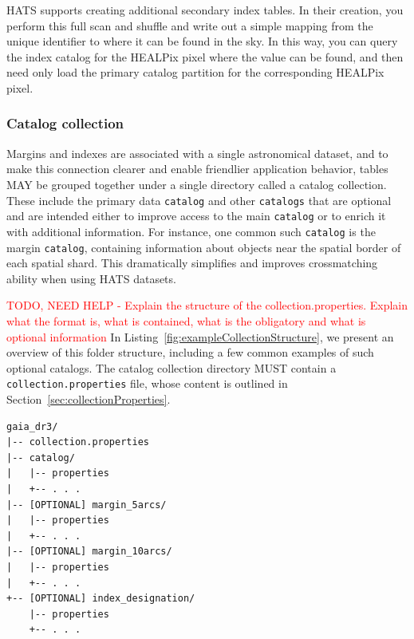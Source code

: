 \documentclass[11pt,a4paper]{ivoa}
\begin{document}
HATS supports creating additional secondary index tables. 
In their creation, you perform this full scan and shuffle and write out a simple mapping from the unique identifier to where it can be found in the sky.
In this way, you can query the index catalog for the HEALPix pixel where the value can be found, and then need only load the primary catalog partition for the corresponding HEALPix pixel.

\subsubsection{Catalog collection} \label{sec:collection}

Margins and indexes are associated with a single astronomical dataset, and to make this connection clearer and enable friendlier application behavior, tables MAY be grouped together under a single directory called a catalog collection.
These include the primary data \texttt{catalog} and other \texttt{catalogs} that are optional and are intended either to improve access to the main \texttt{catalog} or to enrich it with additional information. 
For instance, one common such \texttt{catalog} is the margin \texttt{catalog}, containing information about objects near the spatial border of each spatial shard. This dramatically simplifies and improves crossmatching ability when using HATS datasets. \par 

\textcolor{red}{TODO, NEED HELP -  Explain the structure of the collection.properties. Explain what the format is, what is contained, what is the obligatory and what is optional information}
In Listing~\ref{fig:exampleCollectionStructure}, we present an overview of this folder structure, including a few common examples of such optional catalogs.
The catalog collection directory MUST contain a \texttt{collection.properties} file, whose content is outlined in Section~\ref{sec:collectionProperties}.

\begin{minipage}{\linewidth}
\begin{lstlisting}[caption=Example collection directory contents, label=fig:exampleCollectionStructure]
gaia_dr3/
|-- collection.properties
|-- catalog/
|   |-- properties
|   +-- . . .
|-- [OPTIONAL] margin_5arcs/
|   |-- properties
|   +-- . . .
|-- [OPTIONAL] margin_10arcs/
|   |-- properties
|   +-- . . .
+-- [OPTIONAL] index_designation/
    |-- properties
    +-- . . .
\end{lstlisting}
\end{minipage}
\end{document}
